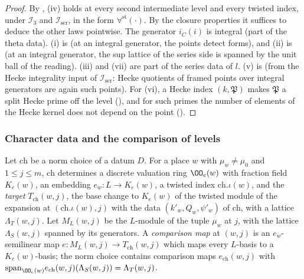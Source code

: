 \begin{proof}
By , (iv) holds at every second intermediate level and
every twisted index, under $\mathcal I_3$ and $\mathcal I_{\mathrm{ser}}$, in the form $\forall^{\mathrm{st}}(\cdot)$. By the
closure properties it suffices to deduce the other laws pointwise. The generator $i_C(i)$ is integral (part of
the theta data). (i) is  (at an integral generator, the points
detect forms), and (ii) is  (at an integral generator, the sup
lattice of the series side is spanned by the unit ball of the reading). (iii) and (vii) are part of the series
data of $l$. (v) is  (from the
Hecke integrality input of $\mathcal I_{\mathrm{ser}}$: Hecke quotients of framed points over integral generators are
again such points). For (vi), a Hecke index $(k,\mathfrak P)$ makes $\mathfrak P$ a split Hecke prime off the level
(), and for such primes the number of
elements of the Hecke kernel does not depend on the point
().
\end{proof}

\subsubsection{Character data and the comparison of levels}

Let $\mathrm{ch}$ be a norm choice of a datum $D$. For a place $w$ with $\mu_w\neq\mu_0$ and $1\le j\le m$, $\mathrm{ch}$
determines a discrete valuation ring $\OO_e(w)$ with fraction field $K_e(w)$, an embedding $e_w:L\to K_e(w)$, a
twisted index $\mathrm{ch}.\iota(w)$, and the \emph{target} $T_{\mathrm{ch}}(w,j)$, the base change to $K_e(w)$ of the twisted
module of the expansion at $(\mathrm{ch}.\iota(w),j)$ with the data $(k'_w,Q_w,\psi'_w)$ of $\mathrm{ch}$, with a lattice
$\Lambda_T(w,j)$. Let $M_L(w,j)$ be the $L$-module of the tuple $\mu_w$ at $j$, with the lattice $\Lambda_S(w,j)$ spanned
by its generators. A \emph{comparison map} at $(w,j)$ is an $e_w$-semilinear map $e:M_L(w,j)\to T_{\mathrm{ch}}(w,j)$
which maps every $L$-basis to a $K_e(w)$-basis; the norm choice contains comparison maps $e_{\mathrm{ch}}(w,j)$ with
$\mathrm{span}_{\OO_e(w)}e_{\mathrm{ch}}(w,j)(\Lambda_S(w,j))=\Lambda_T(w,j)$.

